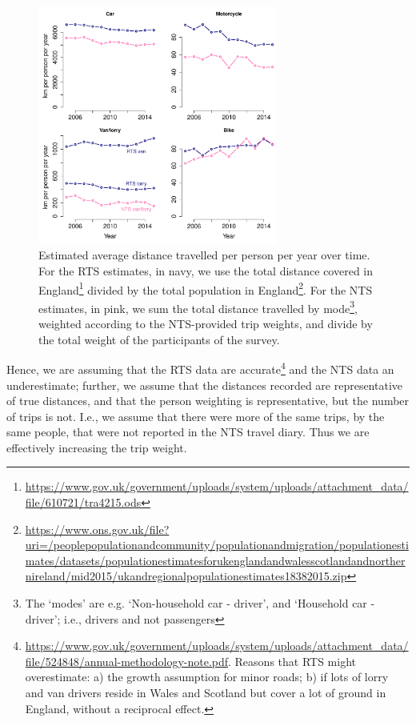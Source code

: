 \documentclass{article}
\begin{document}
\begin{figure}[!b]
\begin{minipage}{\textwidth}
\centering
\includegraphics[width=0.7\textwidth]{NTSvsTRA.pdf}
\caption[Estimated average distance travelled per person per year over time.]{\small Estimated average distance travelled per person per year over time. For the RTS estimates, in navy, we use the total distance covered in England\footnote{\url{https://www.gov.uk/government/uploads/system/uploads/attachment_data/file/610721/tra4215.ods}} divided by the total population in England\protect\footnote{\url{https://www.ons.gov.uk/file?uri=/peoplepopulationandcommunity/populationandmigration/populationestimates/datasets/populationestimatesforukenglandandwalesscotlandandnorthernireland/mid2015/ukandregionalpopulationestimates18382015.zip}}. For the NTS estimates, in pink, we sum the total distance travelled by mode\footnote{The `modes' are e.g. `Non-household car - driver', and `Household car - driver'; i.e., drivers and not passengers}, weighted according to the NTS-provided trip weights, and divide by the total weight of the participants of the survey.}
\label{total}
\end{minipage}
\end{figure}


Hence, we are assuming that the RTS data are accurate\footnote{\url{https://www.gov.uk/government/uploads/system/uploads/attachment_data/file/524848/annual-methodology-note.pdf}. Reasons that RTS might overestimate: a) the growth assumption for minor roads; b) if lots of lorry and van drivers reside in Wales and Scotland but cover a lot of ground in England, without a reciprocal effect.} and the NTS data an underestimate; further, we assume that the distances recorded are representative of true distances, and that the person weighting is representative, but the number of trips is not. I.e., we assume that there were more of the same trips, by the same people, that were not reported in the NTS travel diary. Thus we are effectively increasing the trip weight. %
\end{document}
